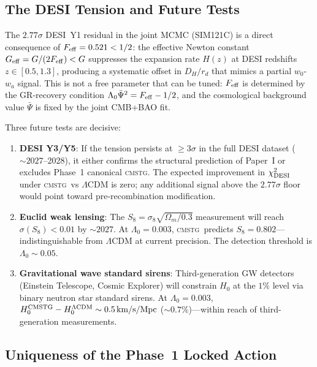 \documentclass[12pt,a4paper]{article}
\newcommand{\CMSTG}{\textsc{cmstg}}
\newcommand{\Psibar}{\bar\Psi}
\newcommand{\Feff}{F_{\rm eff}}
\newcommand{\Geff}{G_{\rm eff}}
\newcommand{\Lz}{\Lambda_0}
\begin{document}
\subsection{The DESI Tension and Future Tests}

The $2.77\sigma$ DESI~Y1 residual in the joint MCMC (SIM121C) is a direct
consequence of $\Feff = 0.521 < 1/2$: the effective Newton constant
$\Geff = G/(2\Feff) < G$ suppresses the expansion rate $H(z)$ at DESI
redshifts $z \in [0.5, 1.3]$, producing a systematic offset in $D_H/r_d$
that mimics a partial $w_0$-$w_a$ signal. This is not a free parameter that
can be tuned: $\Feff$ is determined by the GR-recovery condition $\Lz\Psibar^2
= \Feff - 1/2$, and the cosmological background value $\Psibar$ is fixed by
the joint CMB+BAO fit.

Three future tests are decisive:
\begin{enumerate}
  \item \textbf{DESI Y3/Y5}: If the tension persists at $\geq 3\sigma$ in
    the full DESI dataset ($\sim 2027$--2028), it either confirms the
    structural prediction of Paper~I or excludes Phase~1 canonical \CMSTG.
    The expected improvement in $\chi^2_{\rm DESI}$ under \CMSTG\ vs
    $\Lambda$CDM is zero; any additional signal above the $2.77\sigma$ floor
    would point toward pre-recombination modification.

  \item \textbf{Euclid weak lensing}: The $S_8 = \sigma_8\sqrt{\Omega_m/0.3}$
    measurement will reach $\sigma(S_8) < 0.01$ by $\sim 2027$. At
    $\Lz = 0.003$, \CMSTG\ predicts $S_8 = 0.802$---indistinguishable from
    $\Lambda$CDM at current precision. The detection threshold is $\Lz \sim 0.05$.

  \item \textbf{Gravitational wave standard sirens}: Third-generation GW
    detectors (Einstein Telescope, Cosmic Explorer) will constrain $H_0$ at
    the $1\%$ level via binary neutron star standard sirens. At $\Lz = 0.003$,
    $H_0^{\rm CMSTG} - H_0^{\Lambda\rm CDM} \sim 0.5\,\mathrm{km/s/Mpc}$
    ($\sim0.7\%$)---within reach of third-generation measurements.
\end{enumerate}

\subsection{Uniqueness of the Phase~1 Locked Action}
\end{document}
